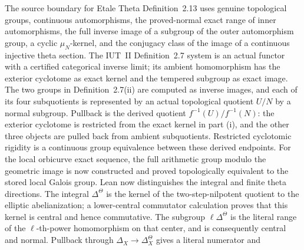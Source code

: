 \begin{definition}
  \leanok
  The source boundary for Etale Theta Definition~2.13 uses genuine
  topological groups, continuous automorphisms, the proved-normal exact range
  of inner automorphisms, the full inverse image of a subgroup of the outer
  automorphism group, a cyclic \(\mu_N\)-kernel, and
  the conjugacy class of the image of a continuous injective theta section.
  The IUT~II Definition~2.7 system is an actual functor with a certified
  categorical inverse limit; its ambient homomorphism has the exterior
  cyclotome as exact kernel and the tempered subgroup as exact image.  The two
  groups in Definition~2.7(ii) are computed as inverse images, and each of its
  four subquotients is represented by an actual topological quotient \(U/N\)
  by a normal subgroup.  Pullback is the derived quotient
  \(f^{-1}(U)/f^{-1}(N)\): the exterior cyclotome is restricted from the exact
  kernel in part (i), and the other three objects are pulled back from ambient
  subquotients.  Restricted cyclotomic rigidity is a continuous group
  equivalence between these derived endpoints.  For the local orbicurve exact
  sequence, the full arithmetic group modulo the geometric image is now
  constructed and proved topologically equivalent to the stored local Galois
  group.  Lean now distinguishes the integral and finite theta directions.
  The integral \(\Delta^\Theta\) is the kernel of the two-step-nilpotent
  quotient to the elliptic abelianization; a lower-central commutator
  calculation proves that this kernel is central and hence commutative.  The
  subgroup \(\ell\Delta^\Theta\) is the literal range of the \(\ell\)-th-power
  homomorphism on that center, and is consequently central and normal.  Pullback
  through \(\Delta_X\to\Delta_X^\Theta\) gives a literal numerator and

\end{definition}

